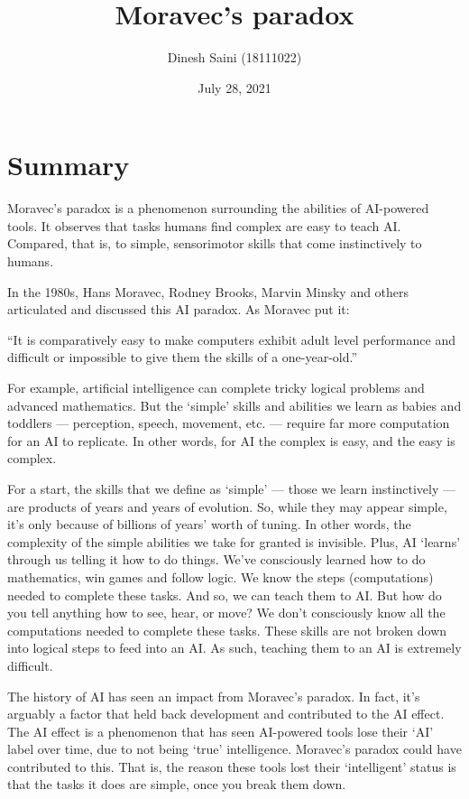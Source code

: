 \documentclass[12pt]{article}
\begin{document}
\title{Moravec's paradox}
\author{Dinesh Saini (18111022)}
\date{July 28, 2021}
\maketitle



\section{Summary}

Moravec’s paradox is a phenomenon surrounding the abilities of AI-powered tools. It observes that tasks humans find complex are easy to teach AI. Compared, that is, to simple, sensorimotor skills that come instinctively to humans.  \par

In the 1980s, Hans Moravec, Rodney Brooks, Marvin Minsky and others articulated and discussed this AI paradox. As Moravec put it:

 \begin{center}
“It is comparatively easy to make computers exhibit adult level performance and difficult or impossible to give them the skills of a one-year-old.”
 \end{center}

For example, artificial intelligence can complete tricky logical problems and advanced mathematics. But the ‘simple’ skills and abilities we learn as babies and toddlers — perception, speech, movement, etc. — require far more computation for an AI to replicate. In other words, for AI the complex is easy, and the easy is complex.   \par

For a start, the skills that we define as ‘simple’ — those we learn instinctively — are products of years and years of evolution. So, while they may appear simple, it’s only because of billions of years’ worth of tuning. In other words, the complexity of the simple abilities we take for granted is invisible. Plus, AI ‘learns’ through us telling it how to do things. We’ve consciously learned how to do mathematics, win games and follow logic. We know the steps (computations) needed to complete these tasks. And so, we can teach them to AI. But how do you tell anything how to see, hear, or move? We don’t consciously know all the computations needed to complete these tasks. These skills are not broken down into logical steps to feed into an AI. As such, teaching them to an AI is extremely difficult.    \par

The history of AI has seen an impact from Moravec’s paradox. In fact, it’s arguably a factor that held back development and contributed to the AI effect. The AI effect is a phenomenon that has seen AI-powered tools lose their ‘AI’ label over time, due to not being ‘true’ intelligence. Moravec’s paradox could have contributed to this. That is, the reason these tools lost their ‘intelligent’ status is that the tasks it does are simple, once you break them down.
\end{document}
